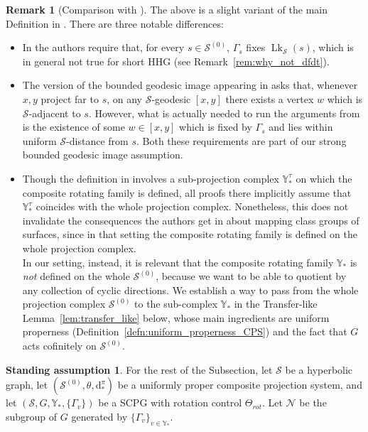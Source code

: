 \documentclass[svgnames]{amsart}
\theoremstyle{plain}
\theoremstyle{definition}
\newtheorem{rem}[thm]{Remark}
\newtheorem{assumption}[thm]{Standing assumption}
\newcommand{\dist}{\mathrm{d}}
\newcommand{\link}{\operatorname{Lk}}
\newcommand{\N}{\mathcal{N}}
\newcommand{\calS}{\mathcal{S}}
\begin{document}
\begin{rem}[Comparison with \cite{dfdt}]
The above is a slight variant of the main Definition in \cite[Section 2]{dfdt}. There are three notable differences:
\begin{itemize}
    \item In \cite{dfdt} the authors require that, for every $s\in \calS^{(0)}$, $\Gamma_s$ fixes $\link_{\mathcal S}(s)$, which is in general not true for short HHG (see Remark~\ref{rem:why_not_dfdt}). 
    \item The version of the bounded geodesic image appearing in \cite{dfdt} asks that, whenever $x, y$ project far to $s$, on any $\calS$-geodesic $[x, y]$ there exists a vertex $w$ which is $\calS$-adjacent to $s$. However, what is actually needed to run the arguments from \cite{dfdt} is the existence of some $w\in [x,y]$ which is fixed by $\Gamma_s$ and lies within uniform $\calS$-distance from $s$. Both these requirements are part of our strong bounded geodesic image assumption.
    \item Though the definition in \cite{dfdt} involves a sub-projection complex $\mathbb{Y}^\tau_*$ on which the composite rotating family is defined, all proofs there implicitly assume that $\mathbb{Y}^\tau_*$ coincides with the whole projection complex. Nonetheless, this does not invalidate the consequences the authors get in \cite[Section 5]{dfdt} about mapping class groups of surfaces, since in that setting the composite rotating family is defined on the whole projection complex.
    \\
    In our setting, instead, it is relevant that the composite rotating family $\mathbb{Y}_*$ is \emph{not} defined on the whole $\calS^{(0)}$, because we want to be able to quotient by any collection of cyclic directions. We establish a way to pass from the whole projection complex $\calS^{(0)}$ to the sub-complex $\mathbb{Y}_*$ in the Transfer-like Lemma~\ref{lem:transfer_like} below, whose main ingredients are uniform properness (Definition~\ref{defn:uniform_properness_CPS}) and the fact that $G$ acts cofinitely on $\calS^{(0)}$.
\end{itemize}
\end{rem}


\begin{assumption}
    For the rest of the Subsection, let $\calS$ be a hyperbolic graph, let $(\calS^{(0)},\theta,\dist^\pi_*)$ be a uniformly proper composite projection system, and let $(\mathcal S, G, \mathbb{Y}_*, \{\Gamma_v\})$ be a SCPG with rotation control $\Theta_{rot}$. Let $\N$ be the subgroup of $G$ generated by $\{\Gamma_v\}_{v\in\mathbb{Y}_*}$.
\end{assumption}
\end{document}
